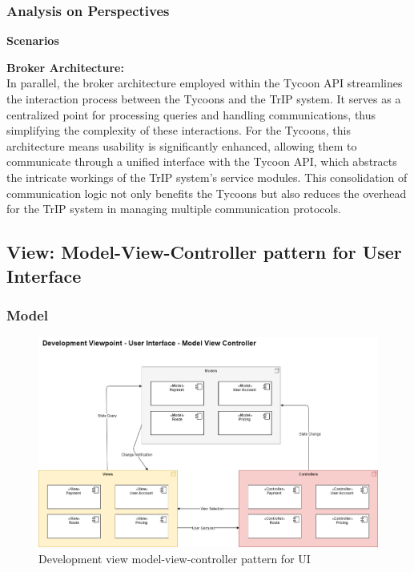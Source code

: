 \subsubsection{Analysis on Perspectives}
\textbf{Scenarios}
\scenarioOneDevelopment

\noindent \textbf{Broker Architecture:} \\
In parallel, the broker architecture employed within the Tycoon API streamlines the interaction process between the Tycoons and the TrIP system. It serves as a centralized point for processing queries and handling communications, thus simplifying the complexity of these interactions. For the Tycoons, this architecture means usability is significantly enhanced, allowing them to communicate through a unified interface with the Tycoon API, which abstracts the intricate workings of the TrIP system's service modules. This consolidation of communication logic not only benefits the Tycoons but also reduces the overhead for the TrIP system in managing multiple communication protocols. \\

\subsection{View: Model-View-Controller pattern for User Interface}
\subsubsection{Model}
\begin{figure}[H]
    \centering
    \includegraphics[width=\textwidth]{drawings/views_final_version/development_view_User_Interface.png}
    \caption{Development view model-view-controller pattern for UI}
    \label{fig:development_view_User_Interface}
\end{figure}

